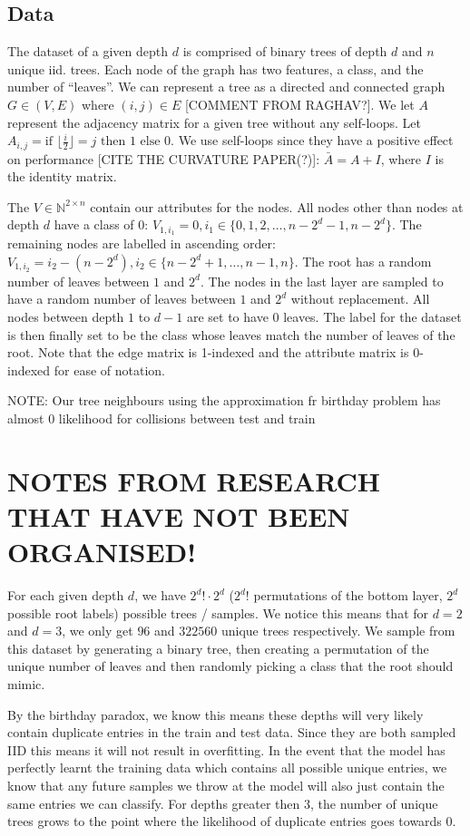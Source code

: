 \documentclass[a4paper,12pt]{article}
\begin{document}
\subsection{Data}
The dataset of a given depth $d$ is comprised of binary trees of depth $d$ and $n$ unique iid. trees. Each node of the graph has two features, a class, and the number of ``leaves''. We can represent a tree as a directed and connected graph $G \in (V, E)$ where $(i, j) \in E$ [COMMENT FROM RAGHAV?].
We let $A$ represent the adjacency matrix for a given tree without any self-loops. Let $A_{i,j}= \text{if } \lfloor \frac{i}{2}\rfloor = j \text{ then } 1 \text{ else } 0$. We use self-loops since they have a positive effect on performance [CITE THE CURVATURE PAPER(?)]: $\bar{A}=A+I$, where $I$ is the identity matrix.

The $V \in \mathbb{N}^{2 \times n}$ contain our attributes for the nodes. All nodes other than nodes at depth $d$ have a class of 0: $V_{1, i_{1}} = 0, i_{1} \in \{0, 1, 2, \ldots, n-2^{d}-1, n-2^{d}\}$. The remaining nodes are labelled in ascending order: $V_{1, i_{2}}= i_{2}-(n-2^{d}), i_{2} \in \{n-2^{d}+1, \ldots, n-1, n\}$.
The root has a random number of leaves between $1$ and $2^{d}$. The nodes in the last layer are sampled to have a random number of leaves between $1$ and $2^{d}$ without replacement. All nodes between depth $1$ to $d-1$ are set to have 0 leaves. The label for the dataset is then finally set to be the class whose leaves match the number of leaves of the root. Note that the edge matrix is 1-indexed and the attribute matrix is 0-indexed for ease of notation.

NOTE:
Our tree neighbours using the approximation fr birthday problem has almost 0 likelihood for collisions between test and train


\section{NOTES FROM RESEARCH THAT HAVE NOT BEEN ORGANISED!}

For each given depth $d$, we have $2^{d}! \cdot 2^{d}$ ($2^{d}!$ permutations of the bottom layer, $2^{d}$ possible root labels) possible trees / samples. We notice this means that for $d=2$ and $d=3$, we only get $96$ and $322560$ unique trees respectively.
We sample from this dataset by generating a binary tree, then creating a permutation of the unique number of leaves and then randomly picking a class that the root should mimic.

By the birthday paradox, we know this means these depths will very likely contain duplicate entries in the train and test data. Since they are both sampled IID this means it will not result in overfitting. In the event that the model has perfectly learnt the training data which contains all possible unique entries, we know that any future samples we throw at the model will also just contain the same entries we can classify.
For depths greater then 3, the number of unique trees grows to the point where the likelihood of duplicate entries goes towards 0.
\end{document}
